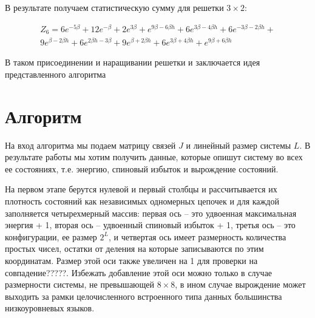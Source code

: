 \documentclass[10pt]{article}
\begin{document}
	В результате получаем статистическую сумму для решетки $3 \times 2$:
	
	\begin{equation}
		\label{eq:stat_3_res}
		\begin{alignedat}{2}
			Z_6 = 6 e^{-5 \beta }+12 e^{-\beta }+2 e^{3 \beta }+e^{9 \beta -6 \beta  h}+6 e^{3 \beta -4 \beta  h}+6 e^{-3 \beta -2 \beta  h}+\\
			9 e^{\beta -2 \beta  h}+6 e^{2 \beta  h-3 \beta }+9 e^{\beta +2 \beta  h}+6 e^{3 \beta +4 \beta  h}+e^{9 \beta +6 \beta  h}
		\end{alignedat}
	\end{equation}
	
	В таком присоединении и наращивании решетки и заключается идея представленного алгоритма
	
	\section{Алгоритм}
	На вход алгоритма мы подаем матрицу связей $J$ и линейный размер системы $L$. В результате работы мы хотим получить данные, которые опишут систему во всех ее состояниях, т.е. энергию, спиновый избыток и вырождение состояний.
	
	На первом этапе берутся нулевой и первый столбцы и рассчитывается их плотность состояний как независимых одномерных цепочек и для каждой заполняется четырехмерный массив: первая ось  – это удвоенная максимальная энергия + 1, вторая ось – удвоенный спиновый избыток + 1, третья ось – это конфигурации, ее размер  $2^L$, и четвертая ось имеет размерность количества простых чисел, остатки от деления на которые записываются по этим координатам. Размер этой оси также увеличен на 1 для проверки на совпадение?????. Избежать добавление этой оси можно только в случае размерности системы, не превышающей $8 \times 8$, в ином случае вырождение может выходить за рамки целочисленного встроенного типа данных большинства низкоуровневых языков.
	
\end{document}
